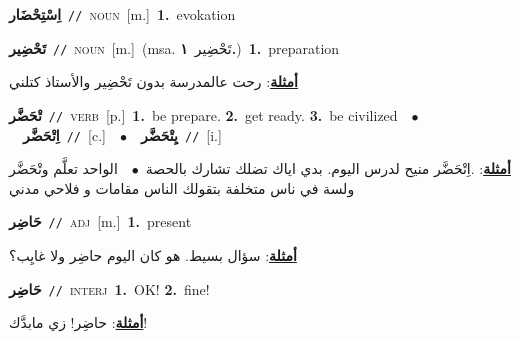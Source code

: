 \documentclass[10pt,a4paper,twoside]{article} %
\begin{document}
\begin{multicols}{2}
{\setlength\topsep{0pt}\textbf{\foreignlanguage{arabic}{اِسْتِحْضَار}}\ {\color{gray}\texttt{//}\color{black}}\ \textsc{noun}\ [m.]\ \textbf{1.}~evokation\ } \vspace{2mm}

{\setlength\topsep{0pt}\textbf{\foreignlanguage{arabic}{تَحْضِير}}\ {\color{gray}\texttt{//}\color{black}}\ \textsc{noun}\ [m.]\ \color{gray}(msa. \foreignlanguage{arabic}{تَحْضِير}~\foreignlanguage{arabic}{\textbf{١.}})\color{black}\ \textbf{1.}~preparation\  \begin{flushright}\color{gray}\foreignlanguage{arabic}{\textbf{\underline{\foreignlanguage{arabic}{أمثلة}}}: رحت عالمدرسة بدون تَحْضِير والأستاذ كتلني}\end{flushright}\color{black}} \vspace{2mm}

{\setlength\topsep{0pt}\textbf{\foreignlanguage{arabic}{تْحَضَّر}}\ {\color{gray}\texttt{//}\color{black}}\ \textsc{verb}\ [p.]\ \textbf{1.}~be prepare.  \textbf{2.}~get ready.  \textbf{3.}~be civilized\ \ $\bullet$\ \ \setlength\topsep{0pt}\textbf{\foreignlanguage{arabic}{اِتْحَضَّر}}\ {\color{gray}\texttt{//}\color{black}}\ [c.]\ \ $\bullet$\ \ \setlength\topsep{0pt}\textbf{\foreignlanguage{arabic}{يِتْحَضَّر}}\ {\color{gray}\texttt{//}\color{black}}\ [i.]\  \begin{flushright}\color{gray}\foreignlanguage{arabic}{\textbf{\underline{\foreignlanguage{arabic}{أمثلة}}}: .اِتْحَضَّر منيح لدرس اليوم. بدي اياك تضلك تشارك بالحصة\ $\bullet$\ \  الواحد تعلَّم وتْحَضَّر ولسة في ناس متخلفة بتقولك الناس مقامات و فلاحي مدني}\end{flushright}\color{black}} \vspace{2mm}

{\setlength\topsep{0pt}\textbf{\foreignlanguage{arabic}{حَاضِر}}\ {\color{gray}\texttt{//}\color{black}}\ \textsc{adj}\ [m.]\ \textbf{1.}~present\  \begin{flushright}\color{gray}\foreignlanguage{arabic}{\textbf{\underline{\foreignlanguage{arabic}{أمثلة}}}: سؤال بسيط. هو كان اليوم حاضِر ولا غايِب؟}\end{flushright}\color{black}} \vspace{2mm}

{\setlength\topsep{0pt}\textbf{\foreignlanguage{arabic}{حَاضِر}}\ {\color{gray}\texttt{//}\color{black}}\ \textsc{interj}\ \textbf{1.}~OK!  \textbf{2.}~fine!\  \begin{flushright}\color{gray}\foreignlanguage{arabic}{\textbf{\underline{\foreignlanguage{arabic}{أمثلة}}}: حاضِر! زي مابدَّك!}\end{flushright}\color{black}} \vspace{2mm}


\end{multicols}
\end{document}
